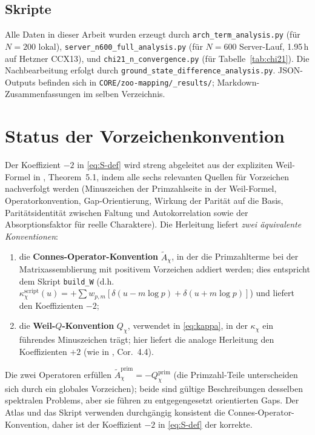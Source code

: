 \documentclass[a4paper,10pt,twocolumn]{article}
\theoremstyle{definition}
\theoremstyle{remark}
\newcommand{\chifn}{\chi}
\begin{document}
\subsection{Skripte}
Alle Daten in dieser Arbeit wurden erzeugt durch
\texttt{arch\_term\_analysis.py} (für $N=200$ lokal),
\texttt{server\_n600\_full\_analysis.py} (für $N=600$ Server-Lauf,
1.95\,h auf Hetzner CCX13), und
\texttt{chi21\_n\_convergence.py} (für Tabelle~\ref{tab:chi21}).
Die Nachbearbeitung erfolgt durch \texttt{ground\_state\_difference\_analysis.py}.
JSON-Outputs befinden sich in \texttt{CORE/zoo-mapping/\_results/}; Markdown-Zusammenfassungen im selben Verzeichnis.

\section{Status der Vorzeichenkonvention}
\label{app:sign}

Der Koeffizient $-2$ in \eqref{eq:S-def} wird streng abgeleitet aus
der expliziten Weil-Formel in \cite{AnalyticKernelV2},
Theorem~5.1, indem alle sechs relevanten Quellen für Vorzeichen nachverfolgt werden (Minuszeichen der Primzahlseite in der Weil-Formel,
Operatorkonvention, Gap-Orientierung, Wirkung der Parität auf die Basis, Paritätsidentität zwischen
Faltung und Autokorrelation sowie der Absorptionsfaktor für reelle Charaktere).
Die Herleitung liefert \emph{zwei äquivalente Konventionen}:
\begin{enumerate}
  \item die \textbf{Connes-Operator-Konvention} $\tilde A_{\chifn}$,
    in der die Primzahlterme bei der Matrixassemblierung mit positivem Vorzeichen
    addiert werden; dies entspricht dem Skript
    \texttt{build\_W} (d.h.\ $\kappa^{\mathrm{script}}_{\chifn}(u)
    =+\sum w_{p,m}[\delta(u-m\log p)+\delta(u+m\log p)]$) und
    liefert den Koeffizienten $-2$;
  \item die \textbf{Weil-$Q$-Konvention} $Q_{\chifn}$, verwendet in
    \eqref{eq:kappa}, in der $\kappa_{\chifn}$ ein führendes
    Minuszeichen trägt; hier liefert die analoge Herleitung den
    Koeffizienten $+2$ (wie in \cite{AnalyticKernel}, Cor.~4.4).
\end{enumerate}
Die zwei Operatoren erfüllen
$\tilde A_{\chifn}^{\mathrm{prim}}=-Q_{\chifn}^{\mathrm{prim}}$ (die
Primzahl-Teile unterscheiden sich durch ein globales Vorzeichen); beide sind gültige Beschreibungen
desselben spektralen Problems, aber sie führen zu entgegengesetzt orientierten Gaps.
Der Atlas und das Skript verwenden durchgängig konsistent die Connes-Operator-Konvention,
daher ist der Koeffizient $-2$ in
\eqref{eq:S-def} der korrekte.
\end{document}
